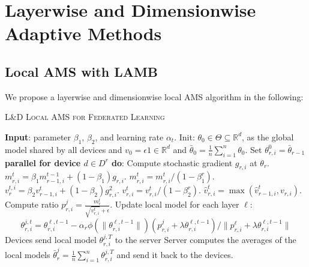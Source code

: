 \documentclass{article}
\begin{document}
\section{Layerwise and Dimensionwise Adaptive Methods}\label{sec:main}


\subsection{Local AMS with LAMB}

We propose a layerwise and dimensionwise local AMS algorithm in the following:

\begin{algorithm}[H]
\caption{\textsc{L\&D Local AMS for Federated Learning}} \label{alg:ldams}
\begin{algorithmic}[1]
\STATE \textbf{Input}: parameter $\beta_1$, $\beta_2$, and learning rate $\alpha_t$. 
\STATE Init: $\theta_{0} \in \Theta \subseteq \mathbb R^d $, as the global model shared by all devices and $v_{0} = \epsilon 1 \in \mathbb R^{d}$ and $\bar{\theta}_0 =  \frac{1}{n} \sum_{i=1}^n \theta_0$.
\STATE Set $\theta_{r,i}^{0} = \bar{\theta}_{r-1}$
\STATE\textbf{parallel for device $d \in D^{r}$ do}:
\STATE Compute stochastic gradient $g_{r,i}$ at $\theta_r$.
\quad \quad {}
\STATE $m^t_{r,i} = \beta_1 m^{t-1}_{r-1,i} + (1 - \beta_1) g_{r,i}$.
\STATE $m^{t}_{r,i}=m^{t}_{r,i} /\left(1-\beta_{1}^{r}\right)$.
\STATE $v^{t,i}_r = \beta_2 v^{t}_{r-1,i} + (1 - \beta_2) g_{r,i}^2$.
\STATE $v^{t}_{r,i}=v^{t}_{r,i} /\left(1-\beta_{2}^{r}\right)$.
\STATE $\hat{v}^{t}_{r,i} = \max( \hat{v}^{t}_{r-1,i} , v_{r,i} )$.
\STATE Compute ratio  $p^j_{r,i}=\frac{m^{t}_{r}}{\sqrt{v^{t}_{r,i}}+\epsilon}$.
\STATE Update local model for each layer $\ell$:
$$\theta_{r,i}^{j,t}=\theta_{r,i}^{\ell,t-1}-\alpha_{r} \phi(\|\theta_{r,i}^{\ell,t-1}\|)(p_{r,i}^{j}+\lambda \theta_{r,i}^{\ell,t-1}) / \|p_{r,i}^{\ell}+\lambda \theta_{r,i}^{\ell,t-1}\|$$
\ENDFOR
\STATE Devices send local model $\theta_{r,i}^{j,T}$ to the server
\STATE Server computes the averages of the local models $\bar{\theta}_r^j = \frac{1}{n} \sum_{i=1}^n \theta_{r,i}^{j,T}$ and send it back to the devices.
\ENDFOR
\end{algorithmic}
\end{algorithm}
\end{document}
